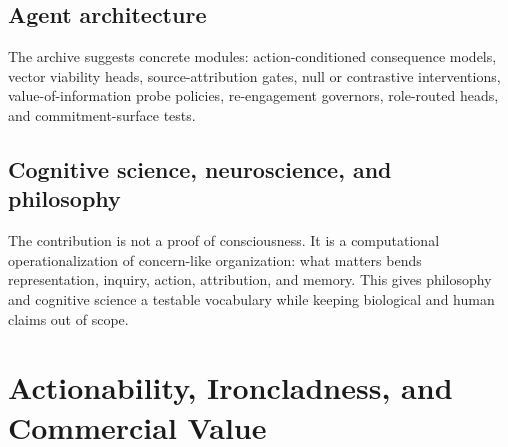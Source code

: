 \documentclass[11pt]{article}
\begin{document}
\subsection{Agent architecture}

The archive suggests concrete modules: action-conditioned consequence models,
vector viability heads, source-attribution gates, null or contrastive
interventions, value-of-information probe policies, re-engagement governors,
role-routed heads, and commitment-surface tests.

\subsection{Cognitive science, neuroscience, and philosophy}

The contribution is not a proof of consciousness. It is a computational
operationalization of concern-like organization: what matters bends
representation, inquiry, action, attribution, and memory. This gives philosophy
and cognitive science a testable vocabulary while keeping biological and human
claims out of scope.

\section{Actionability, Ironcladness, and Commercial Value}
\end{document}
